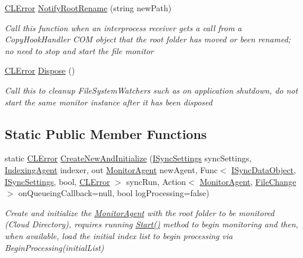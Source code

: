 \begin{DoxyCompactItemize}
\hyperlink{class_cloud_api_public_1_1_model_1_1_c_l_error}{C\-L\-Error} \hyperlink{class_cloud_api_public_1_1_file_monitor_1_1_monitor_agent_a71d7f3790206a3cc461bf843ecbe1ba2}{Notify\-Root\-Rename} (string new\-Path)
\begin{DoxyCompactList}\small\item\em Call this function when an interprocess receiver gets a call from a Copy\-Hook\-Handler C\-O\-M object that the root folder has moved or been renamed; no need to stop and start the file monitor \end{DoxyCompactList}\item 
\hyperlink{class_cloud_api_public_1_1_model_1_1_c_l_error}{C\-L\-Error} \hyperlink{class_cloud_api_public_1_1_file_monitor_1_1_monitor_agent_a6bdf7564ecf0dc66d9490d51d19e2694}{Dispose} ()
\begin{DoxyCompactList}\small\item\em Call this to cleanup File\-System\-Watchers such as on application shutdown, do not start the same monitor instance after it has been disposed \end{DoxyCompactList}\end{DoxyCompactItemize}
\subsection*{Static Public Member Functions}
\begin{DoxyCompactItemize}
\item 
static \hyperlink{class_cloud_api_public_1_1_model_1_1_c_l_error}{C\-L\-Error} \hyperlink{class_cloud_api_public_1_1_file_monitor_1_1_monitor_agent_ac5e74f86eea231c2f46d16cc2f926fb2}{Create\-New\-And\-Initialize} (\hyperlink{interface_cloud_api_public_1_1_interfaces_1_1_i_sync_settings}{I\-Sync\-Settings} sync\-Settings, \hyperlink{class_cloud_api_public_1_1_s_q_l_indexer_1_1_indexing_agent}{Indexing\-Agent} indexer, out \hyperlink{class_cloud_api_public_1_1_file_monitor_1_1_monitor_agent}{Monitor\-Agent} new\-Agent, Func$<$ \hyperlink{interface_cloud_api_public_1_1_interfaces_1_1_i_sync_data_object}{I\-Sync\-Data\-Object}, \hyperlink{interface_cloud_api_public_1_1_interfaces_1_1_i_sync_settings}{I\-Sync\-Settings}, bool, \hyperlink{class_cloud_api_public_1_1_model_1_1_c_l_error}{C\-L\-Error} $>$ sync\-Run, Action$<$ \hyperlink{class_cloud_api_public_1_1_file_monitor_1_1_monitor_agent}{Monitor\-Agent}, \hyperlink{class_cloud_api_public_1_1_model_1_1_file_change}{File\-Change} $>$ on\-Queueing\-Callback=null, bool log\-Processing=false)
\begin{DoxyCompactList}\small\item\em Create and initialize the \hyperlink{class_cloud_api_public_1_1_file_monitor_1_1_monitor_agent}{Monitor\-Agent} with the root folder to be monitored (Cloud Directory), requires running \hyperlink{class_cloud_api_public_1_1_file_monitor_1_1_monitor_agent_a7fd0bcb1837d5a27a32385232f6f463b}{Start()} method to begin monitoring and then, when available, load the initial index list to begin processing via Begin\-Processing(initial\-List) \end{DoxyCompactList}\end{DoxyCompactItemize}


